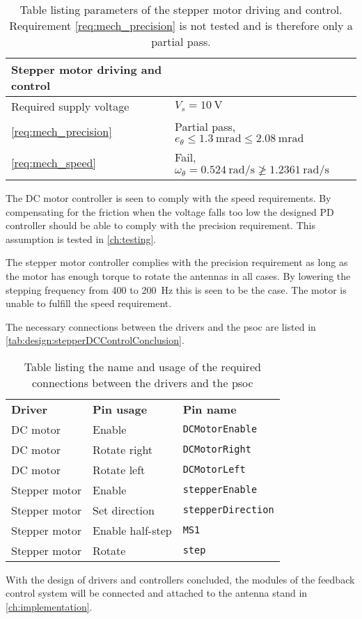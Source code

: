 \begin{table}[h]
	\centering
	\caption{Table listing parameters of the stepper motor driving and control. Requirement \autoref{req:mech_precision} is not tested and is therefore only a partial pass.} \label{tab:design:conclusionStepper}
	
	\begin{tabularx}{\textwidth}{lX}
		\textbf{Stepper motor driving and control} & 				\\ \toprule \rowcolor{lightGrey}
		Required supply voltage			&  $V_s = \SI{10}{\volt}$ 	\\
		\autoref{req:mech_precision}	& Partial pass, $e_\theta \leq\SI{1.3}{\milli\radian}\leq \SI{2.08}{\milli\radian}$ 			\\ \rowcolor{lightGrey}
		\autoref{req:mech_speed} 		& Fail, $\omega_\theta =\SI{0.524}{\radian\per\second} \ngeq  \SI{1.2361}{\radian\per\second}$ 	\\
	\end{tabularx}
\end{table}

The DC motor controller is seen to comply with the speed requirements. By compensating for the friction when the voltage falls too low the designed PD controller should be able to comply with the precision requirement. This assumption is tested in \autoref{ch:testing}.

The stepper motor controller complies with the precision requirement as long as the motor has enough torque to rotate the antennas in all cases. By lowering the stepping frequency from 400 to \SI{200}{\hertz} this is seen to be the case. The motor is unable to fulfill the speed requirement.

The necessary connections between the drivers and the \gls{psoc} are listed in \autoref{tab:design:stepperDCControlConclusion}.

\begin{table}[h]
	\centering
	\caption{Table listing the name and usage of the required connections between the drivers and the \gls{psoc}}\label{tab:design:stepperDCControlConclusion}
	
	\begin{tabularx}{\textwidth}{XXX}
		\textbf{Driver}	&	\textbf{Pin usage} &  	\textbf{Pin name} \\ \rowcolor{lightGrey} \toprule
		DC motor				&	Enable	& \texttt{DCMotorEnable}\\
		DC motor				&	Rotate right	& \texttt{DCMotorRight} \\ \rowcolor{lightGrey}
		DC motor				&	Rotate left	& \texttt{DCMotorLeft} \\
		Stepper motor			&	Enable	& \texttt{stepperEnable}\\\rowcolor{lightGrey}
		Stepper motor			&	Set direction	& \texttt{stepperDirection} \\ 
		Stepper motor			&	Enable half-step	& \texttt{MS1} \\\rowcolor{lightGrey}
		Stepper motor			&	Rotate	& \texttt{step}
	\end{tabularx}	
\end{table}

With the design of drivers and controllers concluded, the modules of the feedback control system will be connected and attached to the antenna stand in \autoref{ch:implementation}.